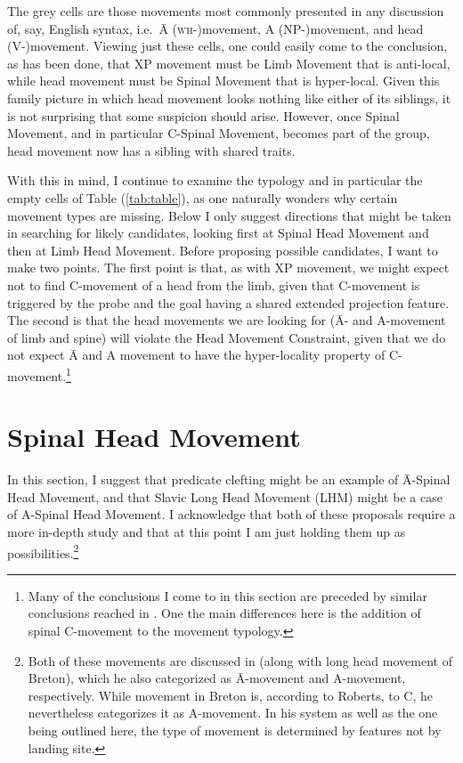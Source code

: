 \documentclass[output=paper,colorlinks,citecolor=brown,
]{langscibook}
\begin{document}
The grey cells are those movements most commonly presented in any discussion of, say, English syntax, i.e.\ \=A (\textsc{wh-})movement, A (NP-)movement, and head (V-)movement.  Viewing just these cells, one could easily come to the conclusion, as has been done, that XP movement must be Limb Movement that is anti-local, while head movement must be Spinal Movement that is hyper-local.  Given this family picture in which head movement looks nothing like either of its siblings, it is not surprising that some suspicion should arise.  However, once Spinal Movement, and in particular C-Spinal Movement, becomes part of the group, head movement now has a sibling with shared traits.

With this in mind, I continue to examine the typology and in particular the empty cells of Table (\ref{tab:table}), as one naturally wonders why certain movement types are missing.  Below I only suggest directions that might be taken in searching for likely candidates, looking first at Spinal Head Movement and then at Limb Head Movement.  Before proposing possible candidates, I want to make two points.  The first point is that, as with XP movement, we might  expect not to find C-movement of a head from the limb, given that C-movement is triggered by the probe and the goal having a shared extended projection feature. The second is that the head movements we are looking for (\=A- and A-movement of limb and spine) will violate the Head Movement Constraint, given that we do not expect  \=A and A movement to have the hyper-locality property of C-movement.\footnote{Many of the conclusions I come to in this section are preceded by similar conclusions reached in \citet{Roberts:2010}.  One the main differences here is the  addition of spinal C-movement to the movement typology.}
 
\section{Spinal Head Movement}

In this section, I suggest that predicate clefting might be an example of \=A-Spinal Head Movement, and that Slavic Long Head Movement (LHM) might be a case of A-Spinal Head Movement.  I acknowledge that both of these proposals require a more in-depth study and that at this point I am just holding them up as possibilities.\footnote{Both of these movements are discussed in \citet{Roberts:2010} (along with long head movement of Breton), which he also categorized as \=A-movement and A-movement, respectively.  While movement in Breton is, according to Roberts, to C, he nevertheless categorizes it as A-movement.  In his system as well as the one being outlined here, the type of movement is determined by features not by landing site.}
\end{document}
